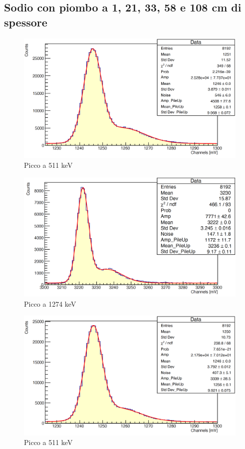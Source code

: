 \documentclass[a4paper,10pt]{article}
\begin{document}
\subsection{Sodio con piombo a 1, 21, 33, 58 e 108 cm di spessore}
\begin{figure}[H]
    \centering
    \includegraphics[scale=0.45]{appendice/spettri/NaPb1_1}
    \caption{Picco a 511 keV}
\end{figure}
\begin{figure}[H]
    \centering
    \includegraphics[scale=0.45]{appendice/spettri/NaPb2_1}
    \caption{Picco a 1274 keV}
\end{figure}
\begin{figure}[H]
    \centering
    \includegraphics[scale=0.45]{appendice/spettri/NaPb1_21}
    \caption{Picco a 511 keV}
\end{figure}
\end{document}
